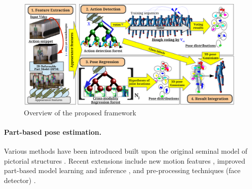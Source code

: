 \begin{figure}
	\centering
	\includegraphics[width=1\linewidth]{fig/body/figure3_overview.pdf}
	\caption{Overview of the proposed framework}
	\label{fig/body/overview}
\end{figure} 

\paragraph{Part-based pose estimation.} 
Various methods have been introduced built upon the original seminal model of pictorial structures \cite{Felzenszwalb2000, Felzenszwalb2010}. Recent extensions include new motion features \cite{Andriluka2009}, improved part-based model learning and inference \cite{Yang2011, Sun2012a}, and pre-processing techniques (\eg face detector) \cite{Eichner2012}. 


